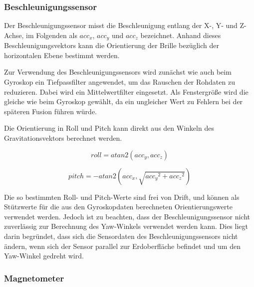 

\subsubsection{Beschleunigungssensor}


Der Beschleunigungssensor misst die Beschleunigung entlang der X-, Y- und Z-Achse, im Folgenden als $acc_x$, $acc_y$ und $acc_z$ bezeichnet.
Anhand dieses Beschleunigungsvektors kann die Orientierung der Brille bezüglich der horizontalen Ebene bestimmt werden.

Zur Verwendung des Beschleunigungssensors wird zunächst wie auch beim
Gyroskop ein Tiefpassfilter angewendet, um das Rauschen der Rohdaten zu
reduzieren.
Dabei wird ein Mittelwertfilter eingesetzt.
Als Fenstergröße wird die gleiche wie beim Gyroskop gewählt, da ein ungleicher Wert zu Fehlern bei der späteren Fusion
führen würde. 


Die Orientierung in Roll und Pitch kann direkt aus den Winkeln des Gravitationsvektors berechnet werden.

\begin{equation}
    roll = atan2(acc_y, acc_z)
\end{equation}

\begin{equation}
    pitch = -atan2(acc_x, \sqrt{ {acc_y}^2 + {acc_z}^2 })
\end{equation}

Die so bestimmten Roll- und Pitch-Werte sind frei von Drift, und können als Stützwerte für die aus den Gyroskopdaten berechneten Orientierungswerte verwendet werden.
Jedoch ist zu beachten, dass der Beschleunigungssensor nicht zuverlässig zur Berechnung des Yaw-Winkels verwendet werden kann.
Dies liegt darin begründet, dass sich die Sensordaten des Beschleunigungssensors nicht ändern, wenn sich der Sensor parallel zur Erdoberfläche befindet und um den Yaw-Winkel gedreht wird.





\subsubsection{Magnetometer}
\label{headtracking_magnetometer_subsubsec}

